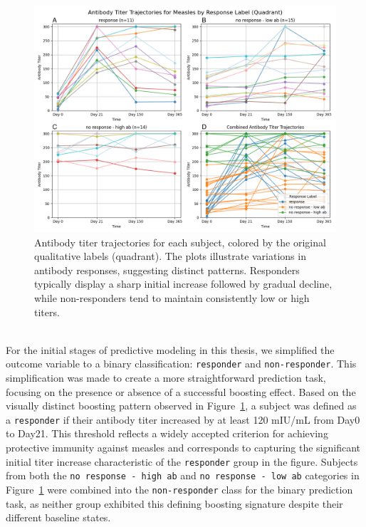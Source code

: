 \documentclass[12pt,a4paper]{report}
\begin{document}
\begin{figure}[h!]
  \centering
  \hspace*{-0.5cm}
  \includegraphics[width=1.05\textwidth]{images/Antibody_Titer_Trajectories_for_Measles_by_Original_Label_(Quadrant).png}
  \caption[Antibody Titer Trajectories by Original Label (Quadrant)]{Antibody titer trajectories for each subject, colored by the original qualitative labels (quadrant). The plots illustrate variations in antibody responses, suggesting distinct patterns. Responders typically display a sharp initial increase followed by gradual decline, while non-responders tend to maintain consistently low or high titers.}
  \label{fig:titer_original_label}
\end{figure}
\\
\noindent
For the initial stages of predictive modeling in this thesis, we simplified the outcome variable to a binary classification: \texttt{responder} and \texttt{non-responder}. This simplification was made to create a more straightforward prediction task, focusing on the presence or absence of a successful boosting effect. Based on the visually distinct boosting pattern observed in Figure~\ref{fig:titer_original_label}, a subject was defined as a \texttt{responder} if their antibody titer increased by at least 120 mIU/mL from Day0 to Day21. This threshold reflects a widely accepted criterion for achieving protective immunity against measles \cite{chen1990measles} and corresponds to capturing the significant initial titer increase characteristic of the \texttt{responder} group in the figure. Subjects from both the \texttt{no response - high ab} and \texttt{no response - low ab} categories in Figure~\ref{fig:titer_original_label} were combined into the \texttt{non-responder} class for the binary prediction task, as neither group exhibited this defining boosting signature despite their different baseline states. 
\end{document}
